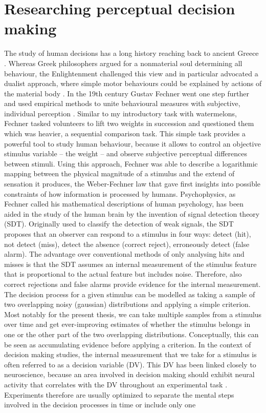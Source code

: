 \section{Researching perceptual decision making}
The study of human decisions has a long history reaching back to ancient Greece \parencite{Aristotle1987,Epicurus1940}. Whereas Greek philosophers argued for a nonmaterial soul determining all behaviour, the Enlightenment challenged this view and in particular \textcite{Descartes1649} advocated a dualist approach, where simple motor behaviours could be explained by actions of the material body \parencite{Descartes1664,Descartes1988}. In the 19th century Gustav Fechner went one step further and used empirical methods%
 to unite behavioural measures with subjective, individual perception \parencite{Fechner1860}. Similar to my introductory task with watermelons, Fechner tasked volunteers to lift two weights in succession and questioned them which was heavier, a sequential comparison task. This simple task provides a powerful tool to study human behaviour, because it allows to control an objective stimulus variable – the weight – and observe subjective perceptual differences between stimuli. Using this approach, Fechner was able to describe a logarithmic mapping between the physical magnitude of a stimulus and the extend of sensation it produces, the Weber-Fechner law that gave first insights into possible constraints of how information is processed by humans. Psychophysics, as Fechner called his mathematical descriptions of human psychology, has been aided in the study of the human brain by the invention of signal detection theory (SDT). Originally used to classify the detection of weak signals, the SDT proposes that an observer can respond to a stimulus in four ways: detect (hit), not detect (miss), detect the absence (correct reject), erroneously detect (false alarm). The advantage over conventional methods of only analysing hits and misses is that the SDT assumes an internal measurement of the stimulus feature that is proportional to the actual feature but includes noise. Therefore, also correct rejections and false alarms provide evidence for the internal measurement. The decision process for a given stimulus can be modelled as taking a sample of two overlapping noisy (gaussian) distributions and applying a simple criterion. Most notably for the present thesis, we can take multiple samples from a stimulus over time and get ever-improving estimates of whether the stimulus belongs in one or the other part of the two overlapping distributions. Conceptually, this can be seen as accumulating evidence before applying a criterion. In the context of decision making studies, the internal measurement that we take for a stimulus is often referred to as a decision variable (DV). This DV has been linked closely to neuroscience, because an area involved in decision making should exhibit neural activity that correlates with the DV throughout an experimental task \parencite{Tanner1954,Gold2007}. Experiments therefore are usually optimized to separate the mental steps involved in the decision processes in time or include only one 